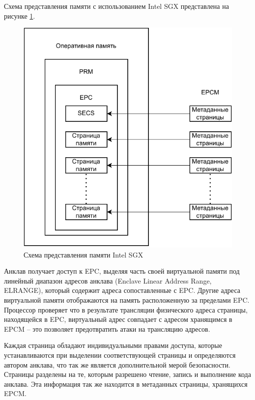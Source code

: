 Схема представления памяти с использованием Intel SGX представлена на рисунке \ref{fig:intel-prm}.

\begin{figure}[h!]
	\centering
	\includegraphics[width=\textwidth]{img/intel-prm.pdf}
	\caption{Схема представления памяти Intel SGX}
	\label{fig:intel-prm}
\end{figure}

Анклав получает доступ к EPC, выделяя часть своей виртуальной памяти под линейный диапазон адресов анклава (Enclave Linear Address Range, ELRANGE), который содержит адреса сопоставленные с EPC. Другие адреса виртуальной памяти отображаются на память расположенную за пределами EPC. Процессор проверяет что в результате трансляции физического адреса страницы, находящейся в EPC, виртуальный адрес совпадает с адресом хранящимся в EPCM -- это позволяет предотвратить атаки на трансляцию адресов.

Каждая страница обладают индивидуальными правами доступа, которые устанавливаются при выделении соответствующей страницы и определяются автором анклава, что так же является дополнительной мерой безопасности. Страницы разделены на те, которым разрешено чтение, запись и выполнение кода анклава. Эта информация так же находится в метаданных страницы, хранящихся EPCM.


